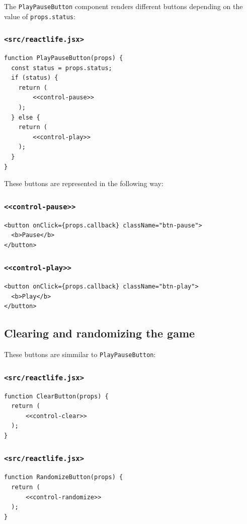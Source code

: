 \documentclass[11pt]{article}
\begin{document}
The \texttt{PlayPauseButton} component renders different buttons depending on the value of \texttt{props.status}:

\subsubsection{\texttt{<src/reactlife.jsx>}}
\label{sec:org5e2ad6a}
\begin{verbatim}
function PlayPauseButton(props) {
  const status = props.status;
  if (status) {
    return (
        <<control-pause>>
    );
  } else {
    return ( 
        <<control-play>>
    );
  }
}
\end{verbatim}

These buttons are represented in the following way:

\subsubsection{\texttt{<<control-pause>>}}
\label{sec:org9f4baa3}
\begin{verbatim}
<button onClick={props.callback} className="btn-pause">
  <b>Pause</b>
</button>
\end{verbatim}

\subsubsection{\texttt{<<control-play>>}}
\label{sec:orge2d8d0c}
\begin{verbatim}
<button onClick={props.callback} className="btn-play">
  <b>Play</b>
</button>
\end{verbatim}

\subsection{Clearing and randomizing the game}
\label{sec:org48e9f77}

These buttons are simmilar to \texttt{PlayPauseButton}:

\subsubsection{\texttt{<src/reactlife.jsx>}}
\label{sec:org36f0be1}
\begin{verbatim}
function ClearButton(props) {
  return ( 
      <<control-clear>>
  );
}
\end{verbatim}

\subsubsection{\texttt{<src/reactlife.jsx>}}
\label{sec:orgdf67754}
\begin{verbatim}
function RandomizeButton(props) {
  return (
      <<control-randomize>> 
  );
}
\end{verbatim}
\end{document}
